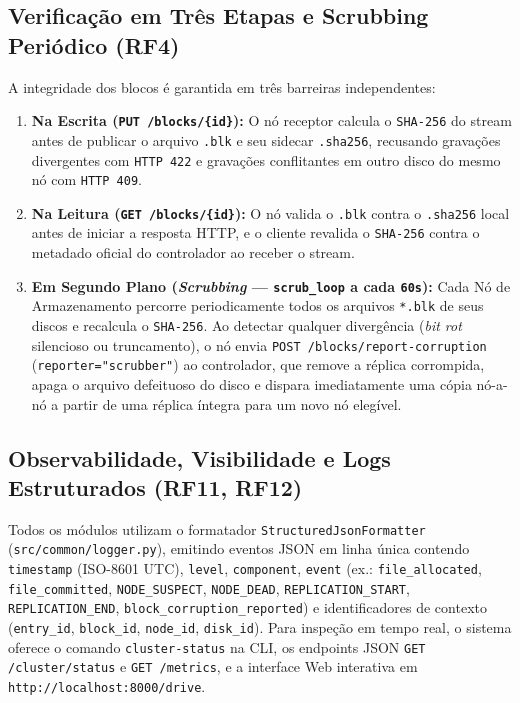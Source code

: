 \documentclass[10pt,a4paper]{article}
\begin{document}
\subsection{Verificação em Três Etapas e Scrubbing Periódico (RF4)}
A integridade dos blocos é garantida em três barreiras independentes:
\begin{enumerate}
    \item \textbf{Na Escrita (\texttt{PUT /blocks/\{id\}}):} O nó receptor calcula o \texttt{SHA-256} do stream antes de publicar o arquivo \texttt{.blk} e seu sidecar \texttt{.sha256}, recusando gravações divergentes com \texttt{HTTP 422} e gravações conflitantes em outro disco do mesmo nó com \texttt{HTTP 409}.
    \item \textbf{Na Leitura (\texttt{GET /blocks/\{id\}}):} O nó valida o \texttt{.blk} contra o \texttt{.sha256} local antes de iniciar a resposta HTTP, e o cliente revalida o \texttt{SHA-256} contra o metadado oficial do controlador ao receber o stream.
    \item \textbf{Em Segundo Plano (\textit{Scrubbing} — \texttt{scrub\_loop} a cada \texttt{60s}):} Cada Nó de Armazenamento percorre periodicamente todos os arquivos \texttt{*.blk} de seus discos e recalcula o \texttt{SHA-256}. Ao detectar qualquer divergência (\textit{bit rot} silencioso ou truncamento), o nó envia \texttt{POST /blocks/report-corruption} (\texttt{reporter="scrubber"}) ao controlador, que remove a réplica corrompida, apaga o arquivo defeituoso do disco e dispara imediatamente uma cópia nó-a-nó a partir de uma réplica íntegra para um novo nó elegível.
\end{enumerate}

\subsection{Observabilidade, Visibilidade e Logs Estruturados (RF11, RF12)}
Todos os módulos utilizam o formatador \texttt{StructuredJsonFormatter} (\texttt{src/common/logger.py}), emitindo eventos JSON em linha única contendo \texttt{timestamp} (ISO-8601 UTC), \texttt{level}, \texttt{component}, \texttt{event} (ex.: \texttt{file\_allocated}, \texttt{file\_committed}, \texttt{NODE\_SUSPECT}, \texttt{NODE\_DEAD}, \texttt{REPLICATION\_START}, \texttt{REPLICATION\_END}, \texttt{block\_corruption\_reported}) e identificadores de contexto (\texttt{entry\_id}, \texttt{block\_id}, \texttt{node\_id}, \texttt{disk\_id}). Para inspeção em tempo real, o sistema oferece o comando \texttt{cluster-status} na CLI, os endpoints JSON \texttt{GET /cluster/status} e \texttt{GET /metrics}, e a interface Web interativa em \texttt{http://localhost:8000/drive}.
\end{document}
